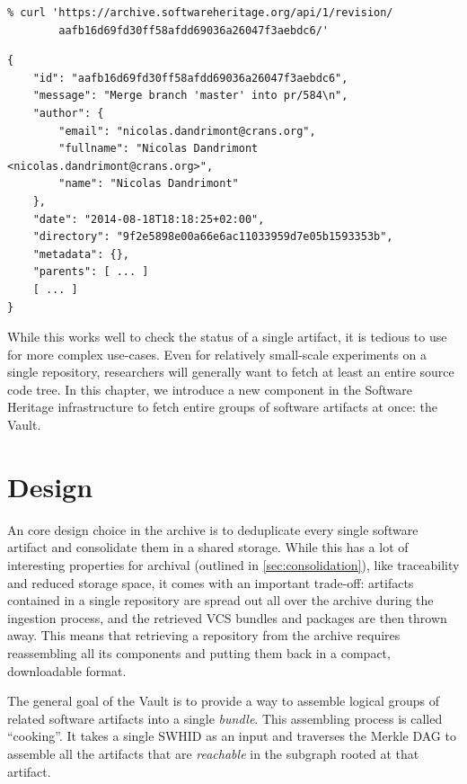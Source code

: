 \begin{minipage}{0.96\textwidth}
\begin{verbatim}
% curl 'https://archive.softwareheritage.org/api/1/revision/
        aafb16d69fd30ff58afdd69036a26047f3aebdc6/'
\end{verbatim}
\begin{verbatim}
{
    "id": "aafb16d69fd30ff58afdd69036a26047f3aebdc6",
    "message": "Merge branch 'master' into pr/584\n",
    "author": {
        "email": "nicolas.dandrimont@crans.org",
        "fullname": "Nicolas Dandrimont <nicolas.dandrimont@crans.org>",
        "name": "Nicolas Dandrimont"
    },
    "date": "2014-08-18T18:18:25+02:00",
    "directory": "9f2e5898e00a66e6ac11033959d7e05b1593353b",
    "metadata": {},
    "parents": [ ... ]
    [ ... ]
}
\end{verbatim}
\end{minipage}

\vspace{1em}

While this works well to check the status of a single artifact, it is tedious
to use for more complex use-cases. Even for relatively small-scale experiments
on a single repository, researchers will generally want to fetch at least an
entire source code tree.  In this chapter, we introduce a new component in the
Software Heritage infrastructure to fetch entire groups of software artifacts
at once: the Vault.

\section{Design}

An core design choice in the \SWH{} archive is to deduplicate every single
software artifact and consolidate them in a shared storage. While this has a
lot of interesting properties for archival (outlined in
\cref{sec:consolidation}), like traceability and reduced storage space, it
comes with an important trade-off: artifacts contained in a single repository
are spread out all over the archive during the ingestion process, and the
retrieved \gls{VCS} bundles and packages are then thrown away. This means that
retrieving a repository from the archive requires reassembling all its
components and putting them back in a compact, downloadable format.

The general goal of the Vault is to provide a way to assemble logical groups of
related software artifacts into a single \emph{bundle}. This assembling process
is called ``cooking''. It takes a single \gls{SWHID} as an input and traverses
the Merkle DAG to assemble all the artifacts that are \emph{reachable} in the
subgraph rooted at that artifact.

